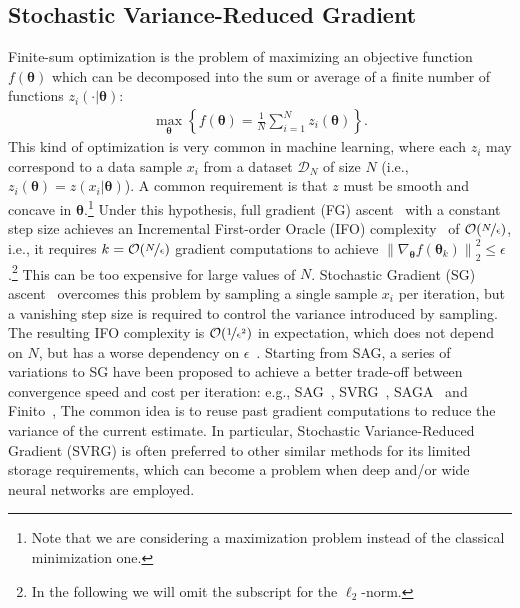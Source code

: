 \documentclass{article}
\makeatletter
\theoremstyle{remark}
\theoremstyle{definition}
\DeclareRobustCommand{\eg}{e.g.,\@\xspace}
\DeclareRobustCommand{\ie}{i.e.,\@\xspace}
\newcommand{\norm}[2][\infty]{\left\|#2\right\|_{#1}}
\newcommand{\vtheta}{\boldsymbol{\theta}}
\makeatother
\begin{document}
\subsection{Stochastic Variance-Reduced Gradient}
Finite-sum optimization is the problem of maximizing an objective function $f(\vtheta)$ which can be decomposed into the sum or average of a finite number of functions $z_i(\cdot|\vtheta)$:
\begin{align*}
        \max_{\vtheta} \left\{ f(\vtheta) = \frac{1}{N}\sum_{i=1}^{N}z_i(\vtheta)\right\}.
\end{align*}
This kind of optimization is very common in machine learning, where each $z_i$ may correspond to a data sample $x_i$ from a dataset $\mathcal{D}_N$ of size $N$ (\ie $z_i(\vtheta) = z(x_i|\vtheta)$). 
A common requirement is that $z$ must be smooth and {\color{red} concave} in $\vtheta$.\footnote{Note that we are considering a maximization problem instead of the classical minimization one.} 
Under this hypothesis, full gradient (FG) ascent~\citep{cauchy1847methode} with a constant step size achieves an Incremental First-order Oracle (IFO) complexity~\citep{agarwal2014lower} of $\mathcal{O}(\nicefrac{N}{\epsilon})$, \ie it requires $k = \mathcal{O}(\nicefrac{N}{\epsilon})$ gradient computations to achieve $\norm[2]{\nabla_{\vtheta}f(\vtheta_k)}^2\leq\epsilon$.\footnote{In the following we will omit the subscript for the $\ell_2$-norm.} 
This can be too expensive for large values of $N$. Stochastic Gradient (SG) ascent~\citep[\eg][]{robbins1951stochastic,bottou2004large} overcomes this problem by sampling a single sample $x_i$ per iteration, but a vanishing step size is required to control the variance introduced by sampling. The resulting IFO complexity is $\mathcal{O}(\nicefrac{1}{\epsilon^2})$ in expectation, which does not depend on $N$, but has a worse dependency on $\epsilon$~\cite{nemirovskii1983problem,reddi2016stochastic}.
Starting from SAG, a series of variations to SG have been proposed to achieve a better trade-off between convergence speed and cost per iteration: \eg SAG~\citep{roux2012stochastic}, SVRG~\cite{johnson2013accelerating}, SAGA~\cite{defazio2014saga} and Finito~\cite{defazio2014finito}, 
The common idea is to reuse past gradient computations to reduce the variance of the current estimate.
In particular, Stochastic Variance-Reduced Gradient (SVRG) is often preferred to other similar methods for its limited storage requirements, which can become a problem when deep and/or wide neural networks are employed.  
\end{document}
